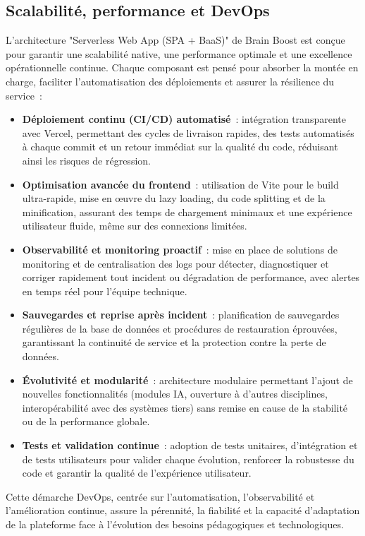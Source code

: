 \documentclass[a4paper,11pt]{report}
\begin{document}
\subsection{Scalabilité, performance et DevOps}
L'architecture "Serverless Web App (SPA + BaaS)" de Brain Boost est conçue pour garantir une scalabilité native, une performance optimale et une excellence opérationnelle continue. Chaque composant est pensé pour absorber la montée en charge, faciliter l'automatisation des déploiements et assurer la résilience du service :
\begin{itemize}
    \item \textbf{Déploiement continu (CI/CD) automatisé} : intégration transparente avec Vercel, permettant des cycles de livraison rapides, des tests automatisés à chaque commit et un retour immédiat sur la qualité du code, réduisant ainsi les risques de régression.
    \item \textbf{Optimisation avancée du frontend} : utilisation de Vite pour le build ultra-rapide, mise en œuvre du lazy loading, du code splitting et de la minification, assurant des temps de chargement minimaux et une expérience utilisateur fluide, même sur des connexions limitées.
    \item \textbf{Observabilité et monitoring proactif} : mise en place de solutions de monitoring et de centralisation des logs pour détecter, diagnostiquer et corriger rapidement tout incident ou dégradation de performance, avec alertes en temps réel pour l'équipe technique.
    \item \textbf{Sauvegardes et reprise après incident} : planification de sauvegardes régulières de la base de données et procédures de restauration éprouvées, garantissant la continuité de service et la protection contre la perte de données.
    \item \textbf{Évolutivité et modularité} : architecture modulaire permettant l'ajout de nouvelles fonctionnalités (modules IA, ouverture à d'autres disciplines, interopérabilité avec des systèmes tiers) sans remise en cause de la stabilité ou de la performance globale.
    \item \textbf{Tests et validation continue} : adoption de tests unitaires, d'intégration et de tests utilisateurs pour valider chaque évolution, renforcer la robustesse du code et garantir la qualité de l'expérience utilisateur.
\end{itemize}
Cette démarche DevOps, centrée sur l'automatisation, l'observabilité et l'amélioration continue, assure la pérennité, la fiabilité et la capacité d'adaptation de la plateforme face à l'évolution des besoins pédagogiques et technologiques.
\end{document}
